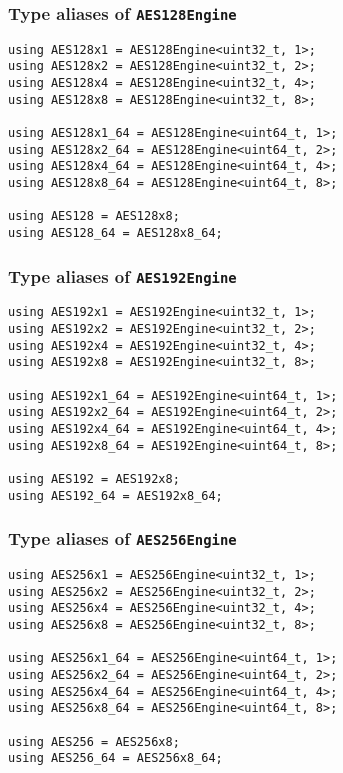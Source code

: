 \subsubsection{Type aliases of \texttt{AES128Engine}}

\begin{verbatim}
using AES128x1 = AES128Engine<uint32_t, 1>;
using AES128x2 = AES128Engine<uint32_t, 2>;
using AES128x4 = AES128Engine<uint32_t, 4>;
using AES128x8 = AES128Engine<uint32_t, 8>;

using AES128x1_64 = AES128Engine<uint64_t, 1>;
using AES128x2_64 = AES128Engine<uint64_t, 2>;
using AES128x4_64 = AES128Engine<uint64_t, 4>;
using AES128x8_64 = AES128Engine<uint64_t, 8>;

using AES128 = AES128x8;
using AES128_64 = AES128x8_64;
\end{verbatim}

\subsubsection{Type aliases of \texttt{AES192Engine}}

\begin{verbatim}
using AES192x1 = AES192Engine<uint32_t, 1>;
using AES192x2 = AES192Engine<uint32_t, 2>;
using AES192x4 = AES192Engine<uint32_t, 4>;
using AES192x8 = AES192Engine<uint32_t, 8>;

using AES192x1_64 = AES192Engine<uint64_t, 1>;
using AES192x2_64 = AES192Engine<uint64_t, 2>;
using AES192x4_64 = AES192Engine<uint64_t, 4>;
using AES192x8_64 = AES192Engine<uint64_t, 8>;

using AES192 = AES192x8;
using AES192_64 = AES192x8_64;
\end{verbatim}

\subsubsection{Type aliases of \texttt{AES256Engine}}

\begin{verbatim}
using AES256x1 = AES256Engine<uint32_t, 1>;
using AES256x2 = AES256Engine<uint32_t, 2>;
using AES256x4 = AES256Engine<uint32_t, 4>;
using AES256x8 = AES256Engine<uint32_t, 8>;

using AES256x1_64 = AES256Engine<uint64_t, 1>;
using AES256x2_64 = AES256Engine<uint64_t, 2>;
using AES256x4_64 = AES256Engine<uint64_t, 4>;
using AES256x8_64 = AES256Engine<uint64_t, 8>;

using AES256 = AES256x8;
using AES256_64 = AES256x8_64;
\end{verbatim}

